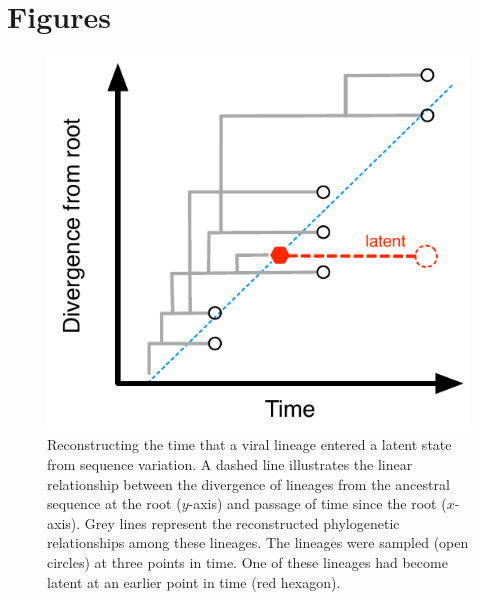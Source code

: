 \documentclass[12pt]{article}
\begin{document}

\clearpage





\clearpage


\section * {Figures}

\begin{figure}[ht]
	\centering
	\includegraphics{figures/latency-scheme}
	\caption[Latency Scheme]{ 
	Reconstructing the time that a viral lineage entered a latent state from sequence variation.  
	A dashed line illustrates the linear relationship between the divergence of lineages from the ancestral sequence at the root ($y$-axis) and passage of time since the root ($x$-axis).
	Grey lines represent the reconstructed phylogenetic relationships among these lineages.
	The lineages were sampled (open circles) at three points in time.
	One of these lineages had become latent at an earlier point in time (red hexagon).
}
\end{figure}
\end{document}
